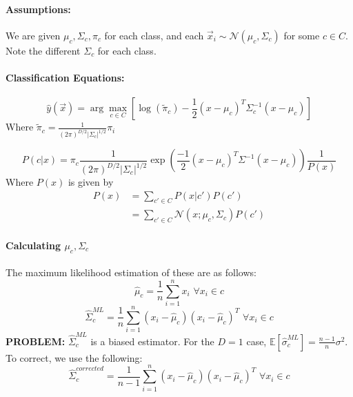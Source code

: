 \documentclass[a4paper,12pt]{report}
\begin{document}
\paragraph{Assumptions: } We are given $\mu_c, \Sigma_c, \pi_c$ for each class, and each $\vec x_i \sim \mathcal N(\mu_c, \Sigma_c)$ for some $c\in C$. Note the different $\Sigma_c$ for each class.

\paragraph{Classification Equations: } 
\begin{equation}
\hat y(\vec x) = \arg\max_{c\in C} [\log (\tilde \pi_c) - \frac{1}{2} (x-\mu_c)^T \Sigma^{-1}_c (x-\mu_c)]
\end{equation}
Where $\tilde \pi_c = \frac{1}{(2\pi)^{D/2} |\Sigma_c|^{1/2}} \pi_i$

\begin{equation}
P(c | x) = \pi_c \frac{1}{(2\pi)^{D/2} |\Sigma_c|^{1/2} } \exp(\frac{-1}{2} (x-\mu_c)^T \Sigma^{-1} (x - \mu_c))\frac{1}{P(x)} 
\end{equation}
Where $P(x)$ is given by
\begin{equation}
\begin{split}
P(x) &= \sum_{c'\in C}^{} P(x | c')P(c') \\
&= \sum_{c'\in C}^{} \mathcal N(x; \mu_c, \Sigma_c) P(c')
\end{split}
\end{equation}

\paragraph{Calculating $\mu_c, \Sigma_c$} 

The maximum likelihood estimation of these are as follows: 
\begin{equation}
\hat\mu_c = \frac{1}{n} \sum_{i=1}^{n} x_i \,\, \forall x_i \in c
\end{equation}
\begin{equation}
\hat \Sigma_c^{ML} = \frac{1}{n} \sum_{i=1}^{n} (x_i - \hat \mu_c)(x_i - \hat\mu_c)^T\,\, \forall x_i \in c
\end{equation}
\textbf{PROBLEM:} $\hat \Sigma_c^{ML}$ is a biased estimator. For the $D=1$ case, $\mathbb E[\hat \sigma_c^{ML}] = \frac{n-1}{n} \sigma^2$. To correct, we use the following:
\begin{equation}
\hat \Sigma_c^{corrected} = \frac{1}{n-1} \sum_{i=1}^{n} (x_i - \hat \mu_c)(x_i - \hat\mu_c)^T\,\, \forall x_i \in c
\end{equation}
\end{document}
